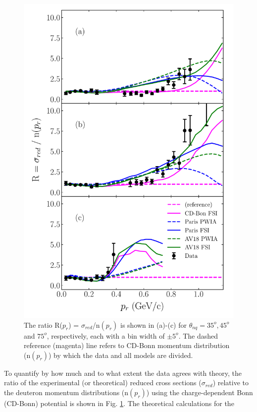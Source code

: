 \begin{figure}
\includegraphics[scale=0.5]{../prl_plots/PRL_plot2.pdf}
\caption{The ratio R($p_{r}$) = $\sigma_{red}$/n$(p_{r})$ is shown in (a)-(c) for $\theta_{nq}=35^{o}, 45^{o}$ and $75^{o}$, respectively, each with a bin width of $\pm 5^{o}$.
                              The dashed reference (magenta) line refers to CD-Bonn momentum distribution (n$(p_{r})$) by which the data and all models are divided. }
\label{fig:fig1}
\end{figure}
\indent To quantify by how much and to what extent the data agrees with theory, the ratio of the experimental (or theoretical) reduced cross sections ($\sigma_{red}$)
relative to the deuteron momentum distributions (n$(p_{r})$) using the charge-dependent Bonn (CD-Bonn) potential\cite{PhysRevC.63.024001} is shown in Fig. \ref{fig:fig1}. The theoretical calculations for the
